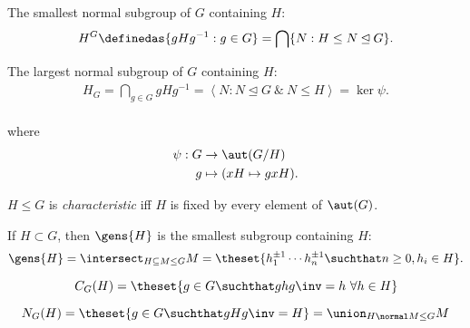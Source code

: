\begin{definition}

The smallest normal subgroup of \(G\) containing \(H\): \[
H^G \definedas \{gHg^{-1}: g\in G\} = \bigcap \{ N: H \leq N \unlhd G \}
.\]

\end{definition}

\begin{definition}

The largest normal subgroup of \(G\) containing \(H\): \begin{align*}
H_G = \bigcap_{g\in G} gHg^{-1} = \left\langle  N: N \unlhd G ~\&~ N \leq H\right\rangle = \ker \psi
.\end{align*}\\
where \begin{align*}
\psi: G &\to \aut(G/H) \\
g &\mapsto (xH\mapsto gxH)
.\end{align*}

\end{definition}

\begin{definition}

\(H\leq G\) is \emph{characteristic} iff \(H\) is fixed by every element
of \(\aut(G)\).

\end{definition}

\begin{definition}

If \(H\subset G\), then \(\gens{H}\) is the smallest subgroup containing
\(H\): \begin{align*}
\gens{H} = \intersect_{H\subseteq M \leq G} M = \theset{ h_1^{\pm 1} \cdots h_n^{\pm 1} \suchthat n\geq 0, h_i \in H}
.\end{align*}

\end{definition}

\begin{definition}[Centralizer]

\[
C_G(H) = \theset{g\in G \suchthat ghg\inv = h ~\forall h\in H}
\]

\end{definition}

\begin{definition}[Normalizer]

\[
N_G(H) = \theset{g\in G \suchthat gHg\inv = H} = \union_{H\normal M \leq G} M
\]

\end{definition}

